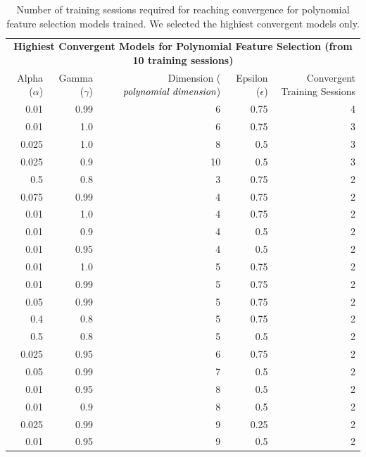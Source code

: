 \documentclass[10pt,twocolumn]{article}
\begin{document}
\newcommand{\ra}[1]{\renewcommand{\arraystretch}{#1}}  
\begin{table}[t]
  \centering
  \ra{1.3}
  \begin{tabular}{@{}rrrr|r@{}}\toprule
  \multicolumn{5}{c}{\textbf{Highiest Convergent Models for Polynomial Feature Selection (from 10 training sessions)}}\\
  Alpha ($\alpha$) & Gamma ($\gamma$) & Dimension ($\emph{polynomial dimension}$) & Epsilon ($\epsilon$) & Convergent Training Sessions\\
  0.01 & 0.99 & 6 & 0.75 & 4\\
  0.01 & 1.0 & 6 & 0.75 & 3\\
  0.025 & 1.0 & 8 & 0.5 & 3\\
  0.025 & 0.9 & 10 & 0.5 & 3\\
  0.5 & 0.8 & 3 & 0.75 & 2\\
  0.075 & 0.99 & 4 & 0.75 & 2\\
  0.01 & 1.0 & 4 & 0.75 & 2\\
  0.01 & 0.9 & 4 & 0.5 & 2\\
  0.01 & 0.95 & 4 & 0.5 & 2\\
  0.01 & 1.0 & 5 & 0.75 & 2\\
  0.01 & 0.99 & 5 & 0.75 & 2\\
  0.05 & 0.99 & 5 & 0.75 & 2\\
  0.4 & 0.8 & 5 & 0.75 & 2\\
  0.5 & 0.8 & 5 & 0.5 & 2\\
  0.025 & 0.95 & 6 & 0.75 & 2\\
  0.05 & 0.99 & 7 & 0.5 & 2\\
  0.01 & 0.95 & 8 & 0.5 & 2\\
  0.01 & 0.9 & 8 & 0.5 & 2\\
  0.025 & 0.99 & 9 & 0.25 & 2\\
  0.01 & 0.95 & 9 & 0.5 & 2\\
  \bottomrule
  \end{tabular}
  \caption{Number of training sessions required for reaching convergence for polynomial feature selection models trained. We selected the highiest convergent models only.}
  \label{polynomial-convergence-result}
\end{table}
\end{document}
